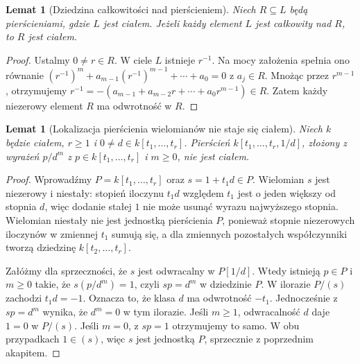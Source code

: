 \documentclass[11pt,a4paper,openany]{report}
\numberwithin{equation}{section}
\theoremstyle{plain}
\newtheorem{lemat}[twierdzenie]{Lemat}
\theoremstyle{definition}
\theoremstyle{remark}
\begin{document}
\begin{lemat}[Dziedzina całkowitości nad pierścieniem]
\label{lem:field-integral}
Niech $R\subseteq L$ będą pierścieniami, gdzie $L$ jest ciałem.
Jeżeli każdy element $L$ jest całkowity nad $R$, to $R$ jest ciałem.
\end{lemat}
\begin{proof}
Ustalmy $0\ne r\in R$. W ciele $L$ istnieje $r^{-1}$.
Na mocy założenia spełnia ono równanie
$(r^{-1})^m+a_{m-1}(r^{-1})^{m-1}+\cdots+a_0=0$
z $a_j\in R$. Mnożąc przez $r^{m-1}$, otrzymujemy
$ r^{-1}=-(a_{m-1}+a_{m-2}r+\cdots+a_0r^{m-1})\in R$.
Zatem każdy niezerowy element $R$ ma odwrotność w $R$.
\end{proof}

\begin{lemat}[Lokalizacja pierścienia wielomianów nie staje się ciałem]
\label{lem:localization-not-field}
Niech $k$ będzie ciałem, $r\ge1$ i
$0\ne d\in k[t_1,\dots,t_r]$.
Pierścień $k[t_1,\dots,t_r,1/d]$, złożony z wyrażeń
$p/d^m$ z $p\in k[t_1,\dots,t_r]$ i $m\ge0$,
nie jest ciałem.
\end{lemat}
\begin{proof}
Wprowadźmy $P=k[t_1,\dots,t_r]$ oraz $s=1+t_1d\in P$.
Wielomian $s$ jest niezerowy i niestały: stopień iloczynu
$t_1d$ względem $t_1$ jest o jeden większy od stopnia $d$,
więc dodanie stałej $1$ nie może usunąć wyrazu najwyższego stopnia.
Wielomian niestały nie jest jednostką pierścienia $P$,
ponieważ stopnie niezerowych iloczynów w zmiennej $t_1$
sumują się, a dla zmiennych pozostałych współczynniki tworzą
dziedzinę $k[t_2,\dots,t_r]$.

Załóżmy dla sprzeczności, że $s$ jest odwracalny w
$P[1/d]$. Wtedy istnieją $p\in P$ i $m\ge0$ takie, że
$s(p/d^m)=1$, czyli $sp=d^m$ w dziedzinie $P$.
W ilorazie $P/(s)$ zachodzi $t_1d=-1$.
Oznacza to, że klasa $d$ ma odwrotność $-t_1$.
Jednocześnie z $sp=d^m$ wynika, że $d^m=0$ w tym ilorazie.
Jeśli $m\ge1$, odwracalność $d$ daje $1=0$ w $P/(s)$.
Jeśli $m=0$, z $sp=1$ otrzymujemy to samo.
W obu przypadkach $1\in(s)$, więc $s$ jest jednostką $P$,
sprzecznie z poprzednim akapitem.
\end{proof}
\end{document}
